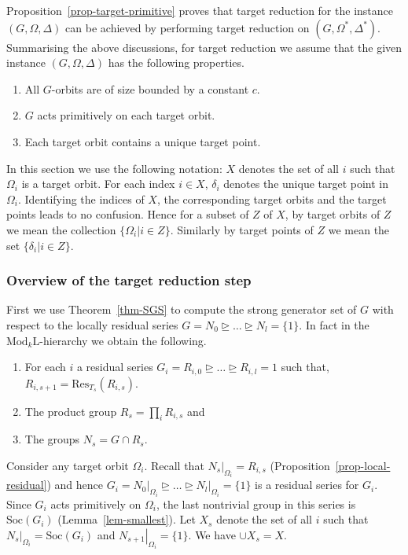 \documentclass[11pt]{madras}%
\theoremstyle{remark}
\newcommand{\ModkL}[1]{{\ensuremath{\mathrm{Mod}_{#1}\mathrm{L}}}}
\newcommand{\pr}[2]{{\ensuremath{\left.{#1}\right\vert_{#2}}}}
\newcommand{\Soc}[1]{{\ensuremath{\mathrm{Soc}\left(#1\right)}}}
\newcommand{\Residue}[2][]{{\ensuremath{\mathrm{Res}_{{#1}}\left(#2\right)}}}
\begin{document}
Proposition~\ref{prop-target-primitive} proves that target reduction
for the instance $(G,\Omega,\Delta)$ can be achieved by performing
target reduction on $(G,\Omega^*,\Delta^*)$.  Summarising the above
discussions, for target reduction we assume that the given instance
$(G,\Omega,\Delta)$ has the following properties.

\begin{enumerate}
\item All $G$-orbits are of size bounded by a constant $c$.
\item $G$ acts primitively on each target orbit.
\item Each target orbit contains a unique target point.
\end{enumerate}

In this section we use the following notation: $X$ denotes the set of
all $i$ such that $\Omega_i$ is a target orbit.  For each index $i \in
X$, $\delta_i$ denotes the unique target point in $\Omega_i$.
Identifying the indices of $X$, the corresponding target orbits and
the target points leads to no confusion. Hence for a subset of $Z$ of
$X$, by target orbits of $Z$ we mean the collection $\{ \Omega_i | i
\in Z\}$.  Similarly by target points of $Z$ we mean the set $\{
\delta_i | i \in Z \}$.

\subsubsection{Overview of the target reduction step}

First we use Theorem~\ref{thm-SGS} to compute the strong generator set
of $G$ with respect to the locally residual series $G = N_0 \unrhd
\ldots \unrhd N_l = \{ 1 \}$. In fact in the $\ModkL{k}$-hierarchy we
obtain the following.
\begin{enumerate}
\item For each $i$ a residual series $G_i = R_{i,0}\unrhd \ldots
  \unrhd R_{i,l} = 1$ such that, $R_{i,s+1} = \Residue[T_s]{R_{i,s}}$.
\item The product group $R_s = \prod_i R_{i,s}$ and 
\item The groups $N_s = G \cap R_s$.
\end{enumerate}

Consider any target orbit $\Omega_i$. Recall that $\pr{N_s}{\Omega_i}
= R_{i,s}$ (Proposition~\ref{prop-local-residual}) and hence $G_i =
\pr{N_0}{\Omega_i} \unrhd \ldots \unrhd \pr{N_l}{\Omega_i} = \{ 1 \}$
is a residual series for $G_i$. Since $G_i$ acts primitively on
$\Omega_i$, the last nontrivial group in this series is $\Soc{G_i}$
(Lemma~\ref{lem-smallest}).  Let $X_s$ denote the set of all $i$ such
that $\pr{N_s}{\Omega_i} = \Soc{G_i}$ and $\pr{N_{s+1}}{\Omega_i} = \{
1 \}$.  We have $\cup X_s = X$.
\end{document}
